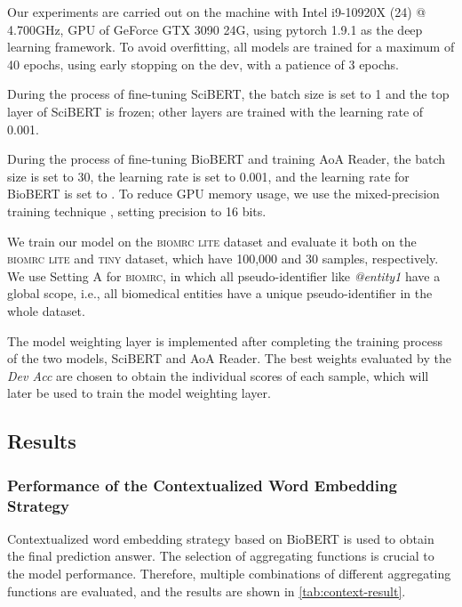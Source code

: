 \documentclass[sigconf, screen]{acmart}
\newcommand{\biomrc}{{\scshape{biomrc}}\xspace}
\newcommand{\biomrclite}{{\scshape{biomrc lite}}\xspace}
\newcommand{\scibert}{Sci\-BERT\xspace}
\newcommand{\biobert}{Bio\-BERT\xspace}
\newcommand{\aoa}{AoA Reader\xspace}
\begin{document}
Our experiments are carried out on the machine with Intel i9-10920X (24) @ 4.700GHz, GPU of GeForce GTX 3090 24G, using pytorch 1.9.1 as the deep learning framework. To avoid overfitting, all models are trained for a maximum of 40 epochs, using early stopping on the dev, with a patience of 3 epochs.

During the process of fine-tuning \scibert, the batch size is set to 1 and the top layer of \scibert is frozen; other layers are trained with the learning rate of 0.001.

During the process of fine-tuning \biobert and training \aoa, the batch size is set to 30, the learning rate is set to 0.001, and the learning rate for \biobert is set to . To reduce GPU memory usage, we use the mixed-precision training technique \cite{micikeviciusMixedPrecisionTraining2018}, setting precision to 16 bits.

We train our model on the \biomrclite dataset and evaluate it both on the \biomrc { \scshape lite } and { \scshape tiny } dataset, which have 100,000 and 30 samples, respectively. We use Setting A for \biomrc, in which all pseudo-identifier like \emph{@entity1} have a global scope, i.e., all biomedical entities have a unique pseudo-identifier in the whole dataset.




The model weighting layer is implemented after completing the training process of the two models, SciBERT and \aoa. The best weights evaluated by the \emph{Dev Acc} are chosen to obtain the individual scores of each sample, which will later be used to train the model weighting layer.

\subsection{Results}

\subsubsection{Performance of the Contextualized Word Embedding Strategy}

Contextualized word embedding strategy based on \biobert is used to obtain the final prediction answer. The selection of aggregating functions is crucial to the model performance. Therefore, multiple combinations of different aggregating functions are evaluated, and the results are shown in \cref{tab:context-result}.
\end{document}
